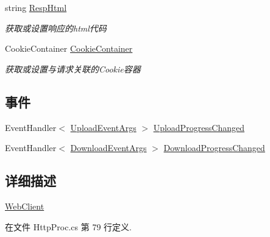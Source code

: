 \begin{DoxyCompactItemize}
string \hyperlink{class_x_c_l_net_tools_1_1_file_handler_1_1_web_client_a67e90e96bd067171c16cb84d75f66c3a}{Resp\-Html}
\begin{DoxyCompactList}\small\item\em 获取或设置响应的html代码 \end{DoxyCompactList}\item 
Cookie\-Container \hyperlink{class_x_c_l_net_tools_1_1_file_handler_1_1_web_client_adeaa1201074e43df3743d76ea77cf06e}{Cookie\-Container}
\begin{DoxyCompactList}\small\item\em 获取或设置与请求关联的\-Cookie容器 \end{DoxyCompactList}\end{DoxyCompactItemize}
\subsection*{事件}
\begin{DoxyCompactItemize}
\item 
Event\-Handler$<$ \hyperlink{class_x_c_l_net_tools_1_1_file_handler_1_1_upload_event_args}{Upload\-Event\-Args} $>$ \hyperlink{class_x_c_l_net_tools_1_1_file_handler_1_1_web_client_abe950fa329508b4c52e3181aeb97585f}{Upload\-Progress\-Changed}
\item 
Event\-Handler$<$ \hyperlink{class_x_c_l_net_tools_1_1_file_handler_1_1_download_event_args}{Download\-Event\-Args} $>$ \hyperlink{class_x_c_l_net_tools_1_1_file_handler_1_1_web_client_aa1e50d608381b728356547eff9f80213}{Download\-Progress\-Changed}
\end{DoxyCompactItemize}


\subsection{详细描述}
\hyperlink{class_x_c_l_net_tools_1_1_file_handler_1_1_web_client}{Web\-Client} 



在文件 Http\-Proc.\-cs 第 79 行定义.



